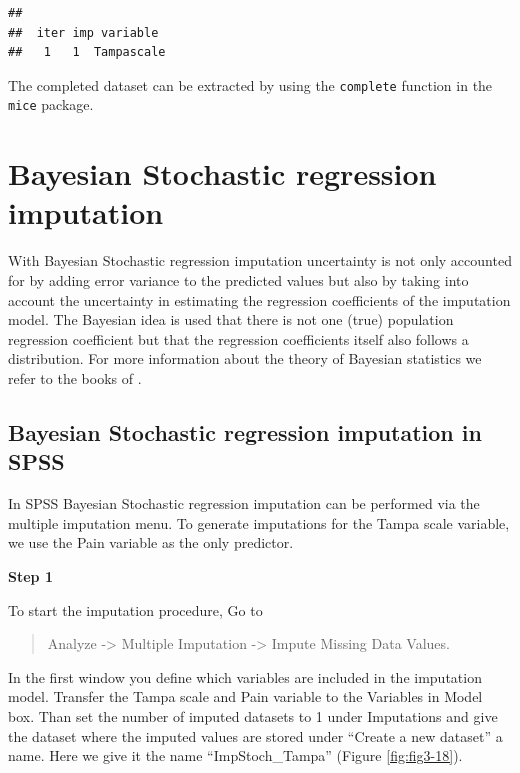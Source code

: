 \documentclass[
]{book}
\begin{document}
\begin{verbatim}
## 
##  iter imp variable
##   1   1  Tampascale
\end{verbatim}

The completed dataset can be extracted by using the \texttt{complete} function in the \texttt{mice} package.

\hypertarget{bayesian-stochastic-regression-imputation}{%
\section{Bayesian Stochastic regression imputation}\label{bayesian-stochastic-regression-imputation}}

With Bayesian Stochastic regression imputation uncertainty is not only accounted for by adding error variance to the predicted values but also by taking into account the uncertainty in estimating the regression coefficients of the imputation model. The Bayesian idea is used that there is not one (true) population regression coefficient but that the regression coefficients itself also follows a distribution. For more information about the theory of Bayesian statistics we refer to the books of \citep{box2007bayesianinferencein, enders2010applied, gelman2014bayesian}.

\hypertarget{bayesian-stochastic-regression-imputation-in-spss}{%
\subsection{Bayesian Stochastic regression imputation in SPSS}\label{bayesian-stochastic-regression-imputation-in-spss}}

In SPSS Bayesian Stochastic regression imputation can be performed via the multiple imputation menu. To generate imputations for the Tampa scale variable, we use the Pain variable as the only predictor.

\textbf{Step 1}

To start the imputation procedure, Go to

\begin{quote}
Analyze -\textgreater{} Multiple Imputation -\textgreater{} Impute Missing Data Values.
\end{quote}

In the first window you define which variables are included in the imputation model. Transfer the Tampa scale and Pain variable to the Variables in Model box. Than set the number of imputed datasets to 1 under Imputations and give the dataset where the imputed values are stored under ``Create a new dataset'' a name. Here we give it the name ``ImpStoch\_Tampa'' (Figure \ref{fig:fig3-18}).
\end{document}
